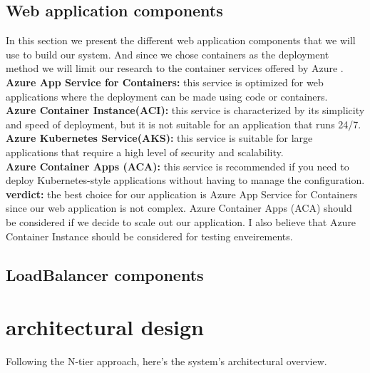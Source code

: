 \subsection{Web application components}
In this section we present the different web application components that we will use to build our system.
And since we chose containers as the deployment method we will limit our research to the container services offered by Azure \cite{webArticle4}.
\\
\textbf{Azure App Service for Containers:} this service is optimized for web applications where the deployment can be made using code or containers.
\\
\textbf{Azure Container Instance(ACI):} this service is characterized by its simplicity and speed of deployment, but it is not suitable for an application that runs 24/7.
\\
\textbf{Azure Kubernetes Service(AKS):} this service is suitable for large applications that require a high level of security and scalability.
\\
\textbf{Azure Container Apps (ACA):} this service is recommended if you need to deploy Kubernetes-style applications without having to manage the configuration.
\\
\textbf{verdict:} the best choice for our application is Azure App Service for Containers since our web application is not complex. Azure Container Apps (ACA) should be considered if we decide to scale out our application.
I also believe that Azure Container Instance should be considered for testing enveirements.
\subsection{LoadBalancer components}
\section{architectural design}
Following the N-tier approach, here's the system's architectural overview.
